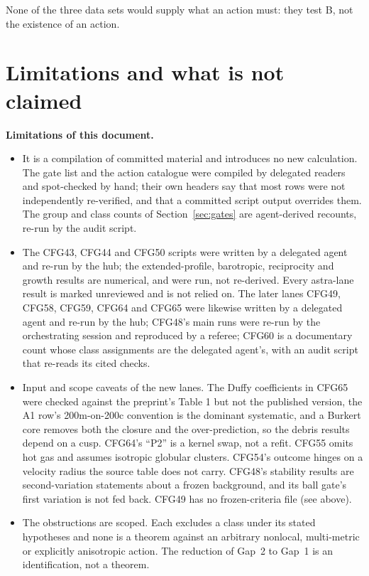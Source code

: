 \documentclass[10pt]{article}
\begin{document}
None of the three data sets would supply what an action must: they test B, not the existence of an action.

\section{Limitations and what is not claimed}\label{sec:not}

\textbf{Limitations of this document.}
\begin{itemize}
\item It is a compilation of committed material and introduces no new calculation. The gate list and the action catalogue were compiled by delegated readers and spot-checked by hand; their own headers say that most rows were not independently re-verified, and that a committed script output overrides them. The group and class counts of Section~\ref{sec:gates} are agent-derived recounts, re-run by the audit script.
\item The CFG43, CFG44 and CFG50 scripts were written by a delegated agent and re-run by the hub; the extended-profile, barotropic, reciprocity and growth results are numerical, and were run, not re-derived. Every astra-lane result is marked unreviewed and is not relied on. The later lanes CFG49, CFG58, CFG59, CFG64 and CFG65 were likewise written by a delegated agent and re-run by the hub; CFG48's main runs were re-run by the orchestrating session and reproduced by a referee; CFG60 is a documentary count whose class assignments are the delegated agent's, with an audit script that re-reads its cited checks.
\item Input and scope caveats of the new lanes. The Duffy coefficients in CFG65 were checked against the preprint's Table 1 but not the published version, the A1 row's 200m-on-200c convention is the dominant systematic, and a Burkert core removes both the closure and the over-prediction, so the debris results depend on a cusp. CFG64's ``P2'' is a kernel swap, not a refit. CFG55 omits hot gas and assumes isotropic globular clusters. CFG54's outcome hinges on a velocity radius the source table does not carry. CFG48's stability results are second-variation statements about a frozen background, and its ball gate's first variation is not fed back. CFG49 has no frozen-criteria file (see above).
\item The obstructions are scoped. Each excludes a class under its stated hypotheses and none is a theorem against an arbitrary nonlocal, multi-metric or explicitly anisotropic action. The reduction of Gap~2 to Gap~1 is an identification, not a theorem.

\end{itemize}
\end{document}
